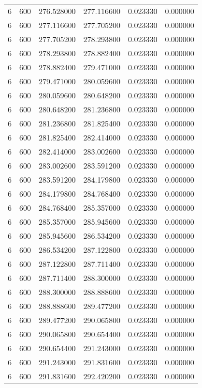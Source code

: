 \begin{longtable}{rrrrrr}
6 & 600 & 276.528000 & 277.116600 & 0.023330 & 0.000000 \\
6 & 600 & 277.116600 & 277.705200 & 0.023330 & 0.000000 \\
6 & 600 & 277.705200 & 278.293800 & 0.023330 & 0.000000 \\
6 & 600 & 278.293800 & 278.882400 & 0.023330 & 0.000000 \\
6 & 600 & 278.882400 & 279.471000 & 0.023330 & 0.000000 \\
6 & 600 & 279.471000 & 280.059600 & 0.023330 & 0.000000 \\
6 & 600 & 280.059600 & 280.648200 & 0.023330 & 0.000000 \\
6 & 600 & 280.648200 & 281.236800 & 0.023330 & 0.000000 \\
6 & 600 & 281.236800 & 281.825400 & 0.023330 & 0.000000 \\
6 & 600 & 281.825400 & 282.414000 & 0.023330 & 0.000000 \\
6 & 600 & 282.414000 & 283.002600 & 0.023330 & 0.000000 \\
6 & 600 & 283.002600 & 283.591200 & 0.023330 & 0.000000 \\
6 & 600 & 283.591200 & 284.179800 & 0.023330 & 0.000000 \\
6 & 600 & 284.179800 & 284.768400 & 0.023330 & 0.000000 \\
6 & 600 & 284.768400 & 285.357000 & 0.023330 & 0.000000 \\
6 & 600 & 285.357000 & 285.945600 & 0.023330 & 0.000000 \\
6 & 600 & 285.945600 & 286.534200 & 0.023330 & 0.000000 \\
6 & 600 & 286.534200 & 287.122800 & 0.023330 & 0.000000 \\
6 & 600 & 287.122800 & 287.711400 & 0.023330 & 0.000000 \\
6 & 600 & 287.711400 & 288.300000 & 0.023330 & 0.000000 \\
6 & 600 & 288.300000 & 288.888600 & 0.023330 & 0.000000 \\
6 & 600 & 288.888600 & 289.477200 & 0.023330 & 0.000000 \\
6 & 600 & 289.477200 & 290.065800 & 0.023330 & 0.000000 \\
6 & 600 & 290.065800 & 290.654400 & 0.023330 & 0.000000 \\
6 & 600 & 290.654400 & 291.243000 & 0.023330 & 0.000000 \\
6 & 600 & 291.243000 & 291.831600 & 0.023330 & 0.000000 \\
6 & 600 & 291.831600 & 292.420200 & 0.023330 & 0.000000 \\

\end{longtable}
